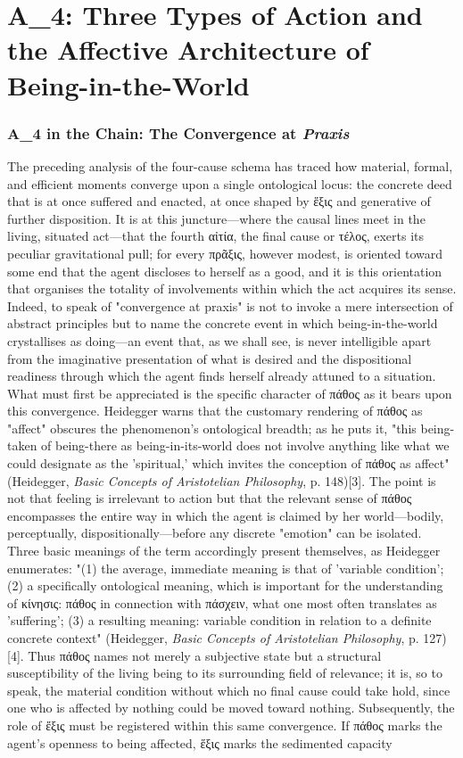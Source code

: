\documentclass{article}
\begin{document}
\section{A\_4: Three Types of Action and the Affective Architecture of Being-in-the-World}

\subsubsection*{A_4 in the Chain: The Convergence at \textit{Praxis}}

The preceding analysis of the four-cause schema has traced how material, formal, and efficient moments converge upon a single ontological locus: the concrete deed that is at once suffered and enacted, at once shaped by ἕξις and generative of further disposition. It is at this juncture—where the causal lines meet in the living, situated act—that the fourth αἰτία, the final cause or τέλος, exerts its peculiar gravitational pull; for every πρᾶξις, however modest, is oriented toward some end that the agent discloses to herself as a good, and it is this orientation that organises the totality of involvements within which the act acquires its sense. Indeed, to speak of "convergence at praxis" is not to invoke a mere intersection of abstract principles but to name the concrete event in which being-in-the-world crystallises as doing—an event that, as we shall see, is never intelligible apart from the imaginative presentation of what is desired and the dispositional readiness through which the agent finds herself already attuned to a situation. What must first be appreciated is the specific character of πάθος as it bears upon this convergence. Heidegger warns that the customary rendering of πάθος as "affect" obscures the phenomenon's ontological breadth; as he puts it, "this being-taken of being-there as being-in-its-world does not involve anything like what we could designate as the 'spiritual,' which invites the conception of πάθος as affect" (Heidegger, \textit{Basic Concepts of Aristotelian Philosophy}, p. 148)[3]. The point is not that feeling is irrelevant to action but that the relevant sense of πάθος encompasses the entire way in which the agent is claimed by her world—bodily, perceptually, dispositionally—before any discrete "emotion" can be isolated. Three basic meanings of the term accordingly present themselves, as Heidegger enumerates: "(1) the average, immediate meaning is that of 'variable condition'; (2) a specifically ontological meaning, which is important for the understanding of κίνησις: πάθος in connection with πάσχειν, what one most often translates as 'suffering'; (3) a resulting meaning: variable condition in relation to a definite concrete context" (Heidegger, \textit{Basic Concepts of Aristotelian Philosophy}, p. 127)[4]. Thus πάθος names not merely a subjective state but a structural susceptibility of the living being to its surrounding field of relevance; it is, so to speak, the material condition without which no final cause could take hold, since one who is affected by nothing could be moved toward nothing. Subsequently, the role of ἕξις must be registered within this same convergence. If πάθος marks the agent's openness to being affected, ἕξις marks the sedimented capacity 
\end{document}
